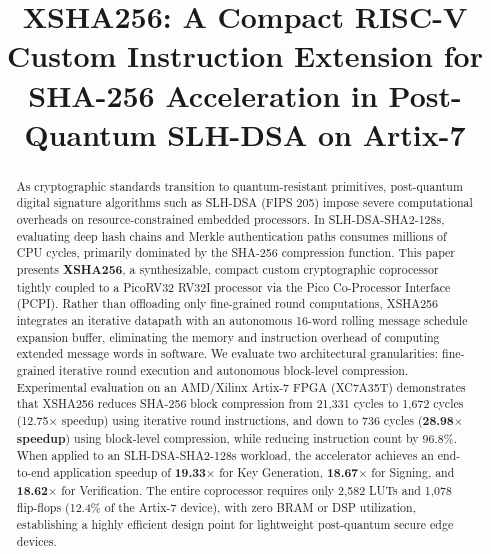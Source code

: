 \documentclass[conference]{IEEEtran}
\begin{document}
\title{XSHA256: A Compact RISC-V Custom Instruction Extension for SHA-256 Acceleration in Post-Quantum SLH-DSA on Artix-7}

\author{
}

\maketitle

\begin{abstract}
As cryptographic standards transition to quantum-resistant primitives, post-quantum digital signature algorithms such as SLH-DSA (FIPS 205) impose severe computational overheads on resource-constrained embedded processors. In SLH-DSA-SHA2-128s, evaluating deep hash chains and Merkle authentication paths consumes millions of CPU cycles, primarily dominated by the SHA-256 compression function. This paper presents \textbf{XSHA256}, a synthesizable, compact custom cryptographic coprocessor tightly coupled to a PicoRV32 RV32I processor via the Pico Co-Processor Interface (PCPI). Rather than offloading only fine-grained round computations, XSHA256 integrates an iterative datapath with an autonomous 16-word rolling message schedule expansion buffer, eliminating the memory and instruction overhead of computing extended message words in software. We evaluate two architectural granularities: fine-grained iterative round execution and autonomous block-level compression. Experimental evaluation on an AMD/Xilinx Artix-7 FPGA (XC7A35T) demonstrates that XSHA256 reduces SHA-256 block compression from 21,331 cycles to 1,672 cycles (12.75$\times$ speedup) using iterative round instructions, and down to 736 cycles (\textbf{28.98$\times$ speedup}) using block-level compression, while reducing instruction count by 96.8\%. When applied to an SLH-DSA-SHA2-128s workload, the accelerator achieves an end-to-end application speedup of \textbf{19.33$\times$} for Key Generation, \textbf{18.67$\times$} for Signing, and \textbf{18.62$\times$} for Verification. The entire coprocessor requires only 2,582 LUTs and 1,078 flip-flops (12.4\% of the Artix-7 device), with zero BRAM or DSP utilization, establishing a highly efficient design point for lightweight post-quantum secure edge devices.
\end{abstract}
\end{document}
